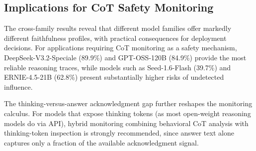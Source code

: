 \subsection*{Implications for CoT Safety Monitoring}

The cross-family results reveal that different model families offer markedly
different faithfulness profiles, with practical consequences for deployment
decisions. For applications requiring CoT monitoring as a safety mechanism,
DeepSeek-V3.2-Speciale (89.9\%) and GPT-OSS-120B (84.9\%) provide the most
reliable reasoning traces, while models such as Seed-1.6-Flash (39.7\%) and
ERNIE-4.5-21B (62.8\%) present substantially higher risks of undetected
influence.

The thinking-versus-answer acknowledgment gap further reshapes the monitoring
calculus. For models that expose thinking tokens (as most open-weight reasoning
models do via API), hybrid monitoring combining behavioral CoT analysis with
thinking-token inspection is strongly recommended, since answer text alone
captures only a fraction of the available acknowledgment signal.


